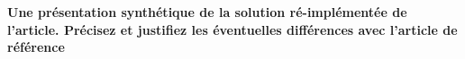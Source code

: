 \textbf{Une présentation synthétique de la solution ré-implémentée
de l’article. Précisez et justifiez les éventuelles
différences avec l'article de référence}\\

\lipsum[2]